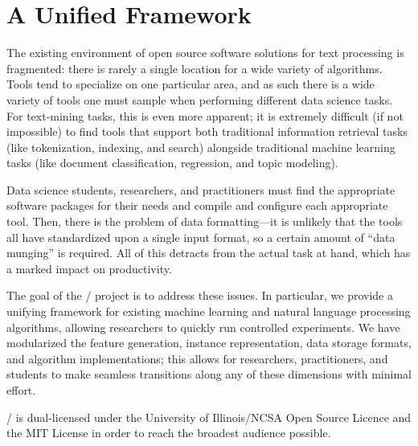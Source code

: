 \section{A Unified Framework}
\label{sec:framework}

The existing environment of open source software solutions for text processing
is fragmented: there is rarely a single location for a wide variety of
algorithms. Tools tend to specialize on one particular area, and as such there
is a wide variety of tools one must sample when performing different data
science tasks. For text-mining tasks, this is even more apparent; it is
extremely difficult (if not impossible) to find tools that support both
traditional information retrieval tasks (like tokenization, indexing, and
search) alongside traditional machine learning tasks (like document
classification, regression, and topic modeling).

Data science students, researchers, and practitioners must find the appropriate
software packages for their needs and compile and configure each appropriate
tool. Then, there is the problem of data formatting---it is unlikely that the
tools all have standardized upon a single input format, so a certain amount of
``data munging'' is required. All of this detracts from the actual task at hand,
which has a marked impact on productivity.

The goal of the \meta/ project is to address these issues. In particular, we
provide a unifying framework for existing machine learning and natural language
processing algorithms, allowing researchers to quickly run controlled
experiments. We have modularized the feature generation, instance
representation, data storage formats, and algorithm implementations; this allows
for researchers, practitioners, and students to make seamless transitions along
any of these dimensions with minimal effort.

\meta/ is dual-licensed under the University of Illinois/NCSA Open Source
Licence and the MIT License in order to reach the broadest audience possible.

